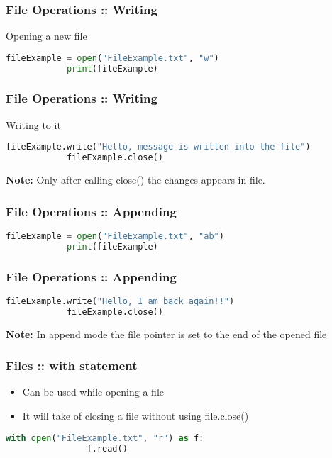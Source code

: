 \documentclass[14pt]{beamer}
\begin{document}
    \begin{frame}[containsverbatim]
        \frametitle{File Operations :: Writing}
        \alert{Opening a new file}
        \begin{lstlisting}[language=Python]
            fileExample = open("FileExample.txt", "w")
            print(fileExample)
        \end{lstlisting}
    \end{frame}
    \begin{frame}[containsverbatim]
        \frametitle{File Operations :: Writing}
        \alert{Writing to it}
        \begin{lstlisting}[language=Python]
            fileExample.write("Hello, message is written into the file")
            fileExample.close()
        \end{lstlisting}
        \textbf{Note:} Only after calling close() the changes appears in file.
    \end{frame}
    \begin{frame}[containsverbatim]
        \frametitle{File Operations :: Appending}
        \begin{lstlisting}[language=Python]
            fileExample = open("FileExample.txt", "ab")
            print(fileExample)
        \end{lstlisting}
    \end{frame}
    \begin{frame}[containsverbatim]
        \frametitle{File Operations :: Appending}
        \begin{lstlisting}[language=Python]
            fileExample.write("Hello, I am back again!!")
            fileExample.close()
        \end{lstlisting}
        \textbf{Note:} In append mode the file pointer is set to the end of the opened file
    \end{frame}
    \begin{frame}[containsverbatim]
        \frametitle{Files :: with statement}
        \begin{itemize}
            \item Can be used while opening a file
            \item It will take of closing a file without using file.close()
        \end{itemize}
        \begin{lstlisting}[language=Python]
            with open("FileExample.txt", "r") as f:
                f.read()
        \end{lstlisting}
    \end{frame}
\end{document}
